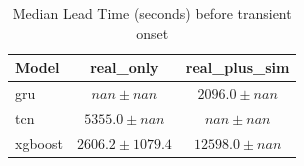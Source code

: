 \begin{table}[htbp]
\centering
\caption{Median Lead Time (seconds) before transient onset}
\label{tab:lead_time}
\begin{tabular}{lcc}
\hline
Model & real_only & real_plus_sim \\
\hline
gru & $nan \pm nan$ & $2096.0 \pm nan$ \\
tcn & $5355.0 \pm nan$ & $nan \pm nan$ \\
xgboost & $2606.2 \pm 1079.4$ & $12598.0 \pm nan$ \\
\hline
\end{tabular}
\end{table}
